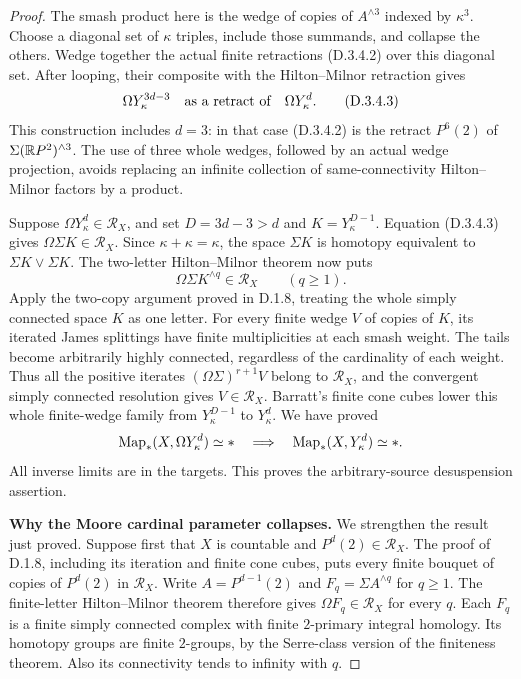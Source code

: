 \begin{proof}
The smash product here is the wedge of copies of $A^{\wedge3}$
indexed by $\kappa^3$. Choose a diagonal set of $\kappa$ triples,
include those summands, and collapse the others. Wedge together
the actual finite retractions (D.3.4.2) over this diagonal set.
After looping, their composite with the Hilton--Milnor
retraction gives
\[
             \Omega Y_\kappa^{3d-3}
              \quad\hbox{as a retract of}\quad
             \Omega Y_\kappa^d .                   \tag{D.3.4.3}
\]
This construction includes $d=3$: in that case (D.3.4.2) is
the retract $P^6(2)$ of $\Sigma(\mathbb{R}P^2)^{\wedge3}$.
The use of three whole wedges, followed by an actual wedge
projection, avoids replacing an infinite collection of
same-connectivity Hilton--Milnor factors by a product.

Suppose $\Omega Y_\kappa^d\in\mathcal R_X$, and set
$D=3d-3>d$ and $K=Y_\kappa^{D-1}$.
Equation (D.3.4.3) gives $\Omega\Sigma K\in\mathcal R_X$.
Since $\kappa+\kappa=\kappa$, the space $\Sigma K$ is
homotopy equivalent to $\Sigma K\vee\Sigma K$.
The two-letter Hilton--Milnor theorem now puts
\[
                     \Omega\Sigma K^{\wedge q}\in\mathcal R_X
                     \qquad(q\geq1).
\]
Apply the two-copy argument proved in D.1.8, treating the
whole simply connected space $K$ as one letter. For every
finite wedge $V$ of copies of $K$, its iterated James
splittings have finite multiplicities at each smash weight.
The tails become arbitrarily highly connected, regardless of
the cardinality of each weight. Thus all the positive iterates
$(\Omega\Sigma)^{r+1}V$ belong to $\mathcal R_X$, and the
convergent simply connected resolution gives
$V\in\mathcal R_X$.
Barratt's finite cone cubes lower this whole finite-wedge
family from $Y_\kappa^{D-1}$ to $Y_\kappa^d$.
We have proved
\[
 \operatorname{Map}_*(X,\Omega Y_\kappa^d)\simeq *
       \quad\Longrightarrow\quad
 \operatorname{Map}_*(X,Y_\kappa^d)\simeq *.
\]
All inverse limits are in the targets. This proves the
arbitrary-source desuspension assertion.

\medskip\noindent
\textbf{Why the Moore cardinal parameter collapses.}
We strengthen the result just proved. Suppose first that $X$
is countable and $P^d(2)\in\mathcal R_X$. The proof of D.1.8,
including its iteration and finite cone cubes, puts every
finite bouquet of copies of $P^d(2)$ in $\mathcal R_X$.
Write $A=P^{d-1}(2)$ and $F_q=\Sigma A^{\wedge q}$ for
$q\geq1$. The finite-letter Hilton--Milnor theorem therefore
gives $\Omega F_q\in\mathcal R_X$ for every $q$.
Each $F_q$ is a finite simply connected complex with finite
$2$-primary integral homology. Its homotopy groups are finite
$2$-groups, by the Serre-class version of the finiteness
theorem. Also its connectivity tends to infinity with $q$.


\end{proof}
